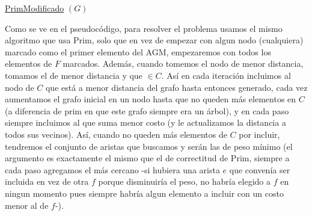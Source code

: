 \documentclass[A4paper,oneside,fleqn,11pt]{article}
\theoremstyle{definition}
\newcommand{\NN}{\mathbb{N}}
\begin{document}
\begin{algorithm}[H]

    \underline{PrimModificado} $(G)$\;
    \Output{$costo \in \NN_{0}$, $lista$ vector de aristas}
       
       	\caption{Devuelve un conjunto de aristas que conectan a todo elemento de $C$ con alguno de $F$ con menor costo y su costo} 
\end{algorithm}


Como se ve en el pseudocódigo, para resolver el problema usamos el mismo algoritmo que usa Prim, solo que en vez de empezar con algun nodo (cualquiera) marcado como el primer elemento del AGM, empezaremos con todos los elementos de $F$ marcados. Además, cuando tomemos el nodo de menor distancia, tomamos el de menor distancia y que $\in C$. Así en cada iteración incluimos al nodo de $C$ que est\'a a menor distancia del grafo hasta entonces generado, cada vez aumentamos el grafo inicial en un nodo hasta que no queden m\'as elementos en $C$ (a diferencia de prim en que este grafo siempre era un \'arbol), y en cada paso siempre incluimos al que suma menor costo (y le actualizamos la distancia a todos sus vecinos). Así, cuando no queden más elementos de $C$ por incluir, tendremos el conjunto de aristas que buscamos y serán las de peso mínimo (el argumento es exactamente el mismo que el de correctitud de Prim, siempre a cada paso agregamos el más cercano -si hubiera una arista $e$ que convenía ser incluida en vez de otra $f$ porque disminuiría el peso, no habría elegido a $f$ en ningun momento pues siempre habría algun elemento a incluir con un costo menor al de $f$-). 
\end{document}
